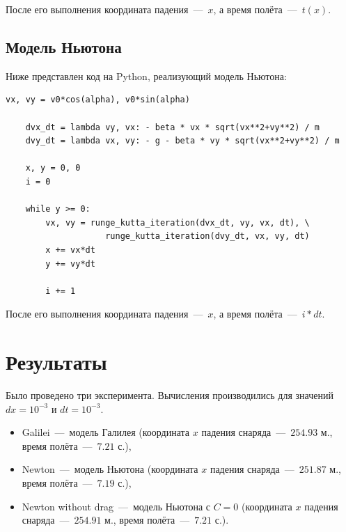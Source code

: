 \documentclass[12pt,a4paper,oneside]{extarticle}
\begin{document}
    После его выполнения координата падения~---~$x$, а время полёта~---~$t(x)$.

    \subsection{Модель Ньютона}
    Ниже представлен код на Python, реализующий модель Ньютона:

    \lstset{language=Python}
        \begin{lstlisting}[mathescape] 
    vx, vy = v0*cos(alpha), v0*sin(alpha)

    dvx_dt = lambda vy, vx: - beta * vx * sqrt(vx**2+vy**2) / m
    dvy_dt = lambda vx, vy: - g - beta * vy * sqrt(vx**2+vy**2) / m

    x, y = 0, 0
    i = 0

    while y >= 0:
        vx, vy = runge_kutta_iteration(dvx_dt, vy, vx, dt), \
                    runge_kutta_iteration(dvy_dt, vx, vy, dt) 
        x += vx*dt
        y += vy*dt

        i += 1
    \end{lstlisting}

    После его выполнения координата падения~---~$x$, а время полёта~---~$i*dt$.

\section{Результаты}
    Было проведено три эксперимента. Вычисления производились для значений $dx=10^{-3}$ и $dt=10^{-3}$.
    \begin{itemize}
        \item Galilei~---~модель Галилея (координата $x$ падения снаряда~---~$254.93$ м., время полёта~---~$7.21$ с.),
        \item Newton~---~модель Ньютона (координата $x$ падения снаряда~---~$251.87$ м., время полёта~---~$7.19$ с.),
        \item Newton without drag~---~модель Ньютона с $C=0$ (координата $x$ падения снаряда~---~$254.91$ м., время полёта~---~$7.21$ с.).
    \end{itemize}
\end{document}
